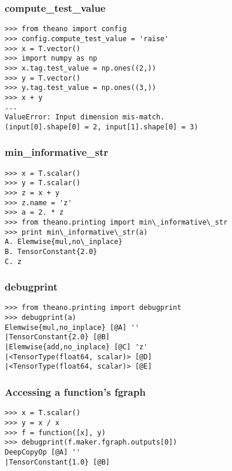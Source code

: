 \documentclass[utf8x,xcolor=pdftex,dvipsnames,table]{beamer}
\begin{document}
\begin{frame}[fragile]
  \frametitle{compute\_test\_value}

\begin{lstlisting}
>>> from theano import config
>>> config.compute_test_value = 'raise'
>>> x = T.vector()
>>> import numpy as np
>>> x.tag.test_value = np.ones((2,))
>>> y = T.vector()
>>> y.tag.test_value = np.ones((3,))
>>> x + y
...
ValueError: Input dimension mis-match.
(input[0].shape[0] = 2, input[1].shape[0] = 3)
\end{lstlisting}
\end{frame}

\begin{frame}[fragile]
  \frametitle{min\_informative\_str}

\begin{lstlisting}
>>> x = T.scalar()
>>> y = T.scalar()
>>> z = x + y
>>> z.name = 'z'
>>> a = 2. * z
>>> from theano.printing import min\_informative\_str
>>> print min\_informative\_str(a)
A. Elemwise{mul,no\_inplace}
B. TensorConstant{2.0}
C. z
\end{lstlisting}
\end{frame}

\begin{frame}[fragile]
  \frametitle{debugprint}

\begin{lstlisting}
>>> from theano.printing import debugprint
>>> debugprint(a)
Elemwise{mul,no_inplace} [@A] ''
|TensorConstant{2.0} [@B]
|Elemwise{add,no_inplace} [@C] 'z'
|<TensorType(float64, scalar)> [@D]
|<TensorType(float64, scalar)> [@E]
\end{lstlisting}
\end{frame}

\begin{frame}[fragile]
  \frametitle{Accessing a function’s fgraph}

\begin{lstlisting}
>>> x = T.scalar()
>>> y = x / x
>>> f = function([x], y)
>>> debugprint(f.maker.fgraph.outputs[0])
DeepCopyOp [@A] ''
|TensorConstant{1.0} [@B]
\end{lstlisting}
\end{frame}
\end{document}
